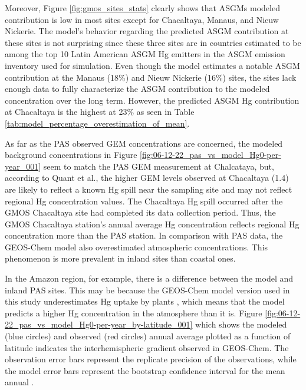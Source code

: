 \begin{flushleft}
Moreover, Figure \ref{fig:gmos_sites_stats} clearly shows that ASGMs modeled contribution is low in most sites except for Chacaltaya, Manaus, and Nieuw Nickerie. The model's behavior regarding the predicted ASGM contribution at these sites is not surprising since these three sites are in countries estimated to be among the top 10 Latin American ASGM Hg emitters in the ASGM emission inventory used for \gc simulation. Even though the model estimates a notable ASGM contribution at the Manaus (18\%) and Nieuw Nickerie (16\%) sites, the sites lack enough data to fully characterize the ASGM contribution to the modeled \hg concentration over the long term. However, the predicted  ASGM Hg contribution at Chacaltaya is the highest at 23\% as seen in Table \ref{tab:model_percentage_overestimation_of_mean}. 
\end{flushleft}
\newpage
\begin{flushleft}
 As far as the PAS observed GEM concentrations are concerned, the modeled background \hg concentrations in Figure \ref{fig:06-12-22_pas_vs_model_Hg0-per-year_001} seem to match the PAS GEM measurement at Chalcataya, but, according to Quant et al.\cite{quant_measuring_2021}, the higher GEM levels observed at Chacaltaya (1.4\nang) are likely to reflect a known Hg spill near the sampling site and may not reflect regional Hg concentration values. The Chacaltaya Hg spill occurred after the GMOS Chacaltaya site had completed its data collection period. Thus, the GMOS Chacaltaya station's annual average Hg concentration reflects regional Hg concentration more than the PAS station. In comparison with PAS data, the GEOS-Chem model also overestimated atmospheric concentrations. This phenomenon is more prevalent in inland sites than coastal ones. 
 
 \end{flushleft}

\begin{flushleft}
 In the Amazon region, for example, there is a difference between the model and inland PAS sites. This may be because the GEOS-Chem model version used in this study underestimates Hg uptake by plants \cite{feinberg_evaluating_2022}, which means that the model predicts a higher Hg concentration in the atmosphere than it is. Figure \ref{fig:06-12-22_pas_vs_model_Hg0-per-year_by-latitude_001} which shows the modeled (blue circles) and observed (red circles) annual average \hg plotted as a function of latitude indicates the interhemispheric gradient observed in GEOS-Chem. The observation error bars represent the replicate precision of the observations, while the model error bars represent the \nft bootstrap confidence interval for the mean annual \hg. 
\end{flushleft}
 
